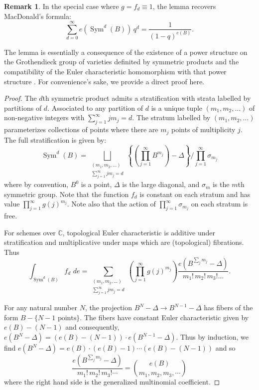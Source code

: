 \documentclass{amsart}
\theoremstyle{definition}
\newtheorem{remark}[theorem]{Remark}
\newcommand{\CC} {\mathbb{C}}          %
\newcommand{\Sym}{\operatorname{Sym}}
\begin{document}
\begin{remark} \label{MacD}
In the special case where $g=f_{d}\equiv  1$, the lemma recovers
MacDonald's formula: $$\sum _{d=0}^{\infty }e (\Sym ^{d} (B)) \, q^{d} =
\frac{1}{(1-q)^{e (B)}}.$$ 

The lemma is essentially a consequence of the existence of a power
structure on the Grothendieck group of varieties definited by
symmetric products and the compatibility of the Euler characteristic
homomorphism with that power structure  \cite{}. For convenience's
sake, we provide a direct proof here.
\end{remark}
\begin{proof}
The $d$th symmetric product admits a stratification with strata
labelled by partitions of $d$. Associated to any partition of $d$ is a
unique tuple $(m_{1},m_{2},\dots )$ of non-negative integers with
$\sum _{j=1}^{\infty }j m_{j}=d$. The stratum labelled by
$(m_{1},m_{2},\dots )$ parameterizes collections of points where there
are $m_{j}$ points of multiplicity $j$. The full stratification is
given by:
\[
\Sym ^{d} (B) = \bigsqcup_{\begin{smallmatrix} (m_{1},m_{2},\dots )\\
\sum _{j=1}^{\infty }j m_{j}=d  \end{smallmatrix}} \left\{\left(\prod _{j=1}^{\infty }B^{m_{j}} \right) -\Delta  \right\}/ \prod _{j=1}^{\infty }\sigma _{m_{j}} 
\]
where by convention, $B^{0}$ is a point, $\Delta $ is the large
diagonal, and $\sigma _{m}$ is the $m$th symmetric group. Note that
the function $f_{d}$ is constant on each stratum and has value $\prod
_{j=1}^{\infty }g (j)^{m_{j}}$. Note also that the action of $\prod
_{j=1}^{\infty }\sigma _{m_{j}}$ on each stratum is free. 

For schemes over $\CC $, topological Euler characteristic is additive
under stratification and multiplicative under maps which are
(topological) fibrations. Thus
\[
\int _{\Sym ^{d} (B)} f_{d}\,\, de = \sum _{\begin{smallmatrix}(m_{1},m_{2},\dots )\\
\sum _{j=1}^{\infty }j m_{j}=d   \end{smallmatrix}} \left(\prod _{j=1}^{\infty } g (j)^{m_{j}} \right) \frac{e (B^{\sum _{j}m_{j}}-\Delta )}{m_{1}!\, m_{2}!\, m_{3}!\dots }.
\]

For any natural number $N$, the projection $B^{N}-\Delta \to
B^{N-1}-\Delta $ has fibers of the form $B-\{N-1\text{ points}
\}$. The fibers have constant Euler characteristic given by $e (B)-
(N-1)$ and consequently, $e (B^{N}-\Delta )= (e (B)- (N-1))\cdot e
(B^{N-1}-\Delta )$. Thus by induction, we find $e (B^{N}-\Delta ) = e
(B)\cdot (e (B)-1)\cdots (e (B)- (N-1))$ and so 
\[
\frac{e (B^{\sum _{j}m_{j}}-\Delta )}{m_{1}!\,m_{2}!\,m_{3}!\cdots } = \binom{e (B)}{m_{1},m_{2},m_{3},\cdots }
\]
where the right hand side is the generalized multinomial coefficient.


\end{proof}
\end{document}
